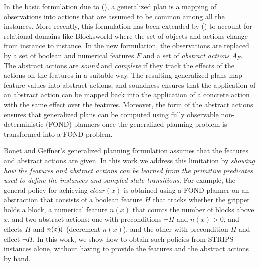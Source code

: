 \documentclass[letterpaper]{article} %
\newcommand{\Omit}[1]{}
\newcommand{\citeay}[1]{\citeauthor{#1} (\citeyear{#1})}
\newcommand{\mminus}{\hspace{-.05em}\raisebox{.15ex}{\footnotesize$\downarrow$}}
\begin{document}
In the basic formulation due  to \citeay{hu:generalized}, a generalized plan
is a mapping of observations into actions that are assumed to be common
among  all the instances. More recently, this formulation has been extended by
\citeay{bonet:ijcai2018} to account for relational domains like Blocksworld  where the set of
objects and  actions change from instance to instance.
In the new formulation, the observations  are replaced by  a set of boolean
and numerical features $F$ and a set of \emph{abstract actions} $A_F$.
The  abstract actions are  \emph{sound} and \emph{complete} if they track the
effects  of the actions on  the features in a suitable way.
The resulting generalized plans  map feature values into abstract actions, and soundness
ensures that the application of an abstract action can be mapped back into the application of
a concrete action with the same effect  over the features. Moreover, the form of the abstract actions
ensures that generalized plans can be computed using fully observable non-deterministic (FOND) planners
once the generalized planning problem is transformed into a FOND problem.

\Omit{
Abstract actions can increase or decrease numerical variables  $n$
associated with the numerical features (e.g., number of blocks above $x$), and while
increments  are transformed into deterministic propositional  effects $n > 0$ where $n > 0$ is
the negation of the proposition $n=0$, decrements  are  transformed  into
non-deterministic (disjunctive)  propositional effects $n > 0 \, | \, n=0$. 
}

Bonet and Geffner's generalized planning formulation assumes that the
features and abstract actions are given. In this work we address this limitation
by  \emph{showing  how the features and abstract actions  can be learned from
the primitive predicates used to define the instances and sampled state transitions.}
For example,  the general policy for achieving $clear(x)$ %
is obtained using a FOND planner on an abstraction that consists of  a  boolean
feature $H$  that tracks whether the gripper holds a block,  a numerical feature
$n(x)$ that counts the number of blocks above $x$, and two abstract actions:
one with preconditions $\neg H$ and $n(x) > 0$, and effects $H$ and $n(x)\mminus$
(decrement $n(x)$), and the other with precondition $H$ and effect $\neg H$.
In this work, we show how to obtain such policies from STRIPS instances alone,
without having to provide the features and the abstract actions by hand.
\end{document}
